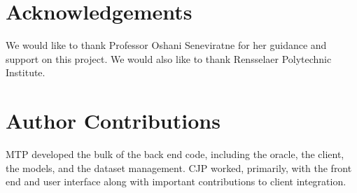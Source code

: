 \documentclass{ledger}
\begin{document}
\ledgernotes

\section*{Acknowledgements} 

We would like to thank Professor Oshani Seneviratne for her guidance and support on this project.
We would also like to thank Rensselaer Polytechnic Institute.

\section*{Author Contributions}

MTP developed the bulk of the back end code, including the oracle, the client, the models, and the dataset management.
CJP worked, primarily, with the front end and user interface along with important contributions to client integration.





\pagebreak









\thispagestyle{pagelast}

\end{document}
